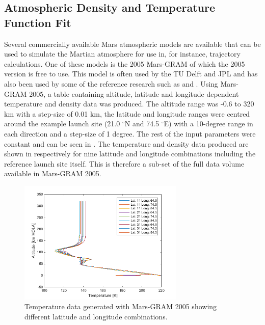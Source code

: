 \subsection{Atmospheric Density and Temperature Function Fit}
\label{subsec:atmofuncfit}
Several commercially available Mars atmospheric models are available that can be used to simulate the Martian atmosphere for use in, for instance, trajectory calculations. One of these models is the 2005 Mars-\acf{GRAM} \citep{justus1990mars} of which the 2005 version is free to use. This model is often used by the TU Delft and \ac{JPL} and has also been used by some of the reference research such as \cite{desai1998} and \cite{trinidad2012}.
Using Mars-\ac{GRAM} 2005, a table containing altitude, latitude and longitude dependent temperature and density data was produced. The altitude range was -0.6 to 320 km  with a step-size of 0.01 km, the latitude and longitude ranges were centred around the example launch site (21.0 $^\circ$N and 74.5 $^\circ$E) with a 10-degree range in each direction and a step-size of 1 degree. The rest of the input parameters were constant and can be seen in . The temperature and density data produced are shown in  respectively for nine latitude and longitude combinations including the reference launch site itself. This is therefore a sub-set of the full data volume available in Mars-\ac{GRAM} 2005.                                                                                                                                                                                                                                                                                                                                                                                                                                                                                          


\begin{figure}[H]
\centering
\includegraphics[width=0.7\textwidth]{figures/software/temperatureData.png}
\caption{Temperature data generated with Mars-\ac{GRAM} 2005 showing different latitude and longitude combinations.}
\label{fig:temperatureData}
\end{figure}

